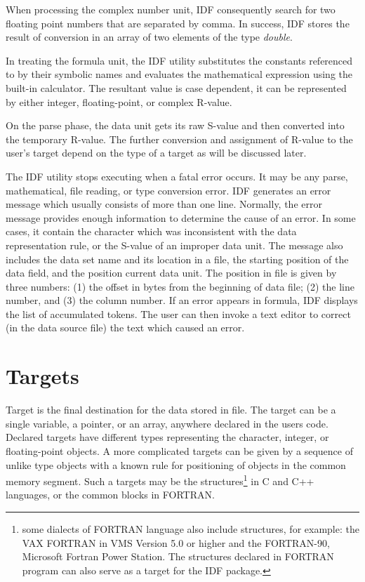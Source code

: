 When processing the complex number unit, IDF consequently search for
two floating point numbers that are separated by comma.
In success, IDF stores the result of conversion in an array of
two elements of the type {\it double}.

In treating the formula unit, 
the IDF utility 
substitutes the constants referenced to by their symbolic names and
evaluates the mathematical expression using the built-in calculator.
The resultant value is case dependent,
it can be represented by either integer, floating-point,
or complex R-value.

On the parse phase, the data unit gets its raw S-value and then
converted into the temporary R-value.
The further conversion and assignment of R-value to the user's target
depend on the type of a target as will be discussed later. 

The IDF utility stops executing when a fatal error occurs.
It may be any parse, mathematical, file reading, or type conversion error.
IDF generates an error message which usually consists of
more than one line. Normally, the error message provides
enough information to determine the cause of an error.
In some cases, it contain the character which was inconsistent
with the data representation rule, or the S-value of an improper
data unit.
The message also includes
the data set name and its location in a file,
the starting position of the data field,
and the position current data unit.
The position in file is given by three numbers:
(1) the offset in bytes from the beginning of data file;
(2) the line number, and (3) the column number.
If an error appears in formula, IDF displays the
list of accumulated tokens.
The user can then invoke a text editor to correct 
(in the data source file) the text which caused an error.

\section{Targets}

Target is the final destination for the data stored in file.
The target can be a single variable, a pointer, or an array,
anywhere declared in the users code. 
Declared targets have different types representing the character, integer,
or floating-point objects.
A more complicated targets can be given by a sequence of unlike type objects
with a known rule for positioning of objects in the common memory segment.
Such a targets may be the structures\footnote{
some dialects of FORTRAN language also include structures, 
for example: the VAX FORTRAN in VMS Version 5.0 or higher and
the FORTRAN-90, Microsoft Fortran Power Station.
The structures declared in FORTRAN program can also serve
as a target for the IDF package.
} in C and C++ languages,
or the common blocks in FORTRAN.

